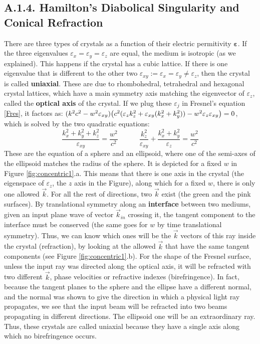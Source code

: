 \documentclass[11pt, a4paper, twoside]{article} %
\begin{document}
\subsection*{A.1.4. Hamilton's Diabolical Singularity and Conical Refraction\vspace{-0.2cm}}
There are three types of crystals as a function of their electric permitivity $\pmb{\varepsilon}$. If the three eigenvalues $\varepsilon_x=\varepsilon_y=\varepsilon_z$ are equal, the medium is isotropic (as we explained). This happens if the crystal has a cubic lattice. If there is one eigenvalue that is different to the other two $\varepsilon_{xy}:=\varepsilon_x=\varepsilon_y\neq \varepsilon_z$, then the crystal is called {\bf uniaxial}. These are due to rhombohedral, tetrahedral and hexagonal crystal lattices, which have a main symmetry axis matching the eigenvector of $\varepsilon_z$, called the {\bf optical axis} of the crystal. If we plug these $\varepsilon_j$ in Fresnel's equation \eqref{Fres}, it factors as: $(k^2c^2-w^2\varepsilon_{xy})\qty(c^2(\varepsilon_zk_z^2+\varepsilon_{xy}(k_x^2+k_y^2))-w^2\varepsilon_z\varepsilon_{xy})=0$, which is solved by the two quadratic equations:
\begin{equation}
\frac{k_x^2+k_y^2+k_z^2}{\varepsilon_{xy}}=\frac{w^2}{c^2} \quad \quad \quad \frac{k_z^2}{\varepsilon_{xy}}+\frac{k_x^2+k_y^2}{\varepsilon_z}=\frac{w^2}{c^2}
\end{equation}
These are the equation of a sphere and an ellipsoid, where one of the semi-axes of the ellipsoid matches the radius of the sphere. It is depicted for a fixed $w$ in Figure \ref{fig:concentric1}.a. This means that there is one axis in the crystal (the eigenspace of $\varepsilon_z$, the $z$ axis in the Figure), along which for a fixed $w$, there is only one allowed $\vec{k}$. For all the rest of directions, two $\vec{k}$ exist (the green and the pink surfaces). By translational symmetry along an {\bf interface} between two mediums, given an input plane wave of vector $\vec{k}_{in}$ crossing it, the tangent component to the interface must be conserved (the same goes for $w$ by time translational symmetry). Thus, we can know which ones will be the $\vec{k}$ vectors of this ray inside the crystal (refraction), by looking at the allowed $\vec{k}$ that have the same tangent components (see Figure \ref{fig:concentric1}.b). For the shape of the Fresnel surface, unless the input ray was directed along the optical axis, it will be refracted with two different $\vec{k}$, phase velocities or refractive indexes (birefringence). In fact, because the tangent planes to the sphere and the ellipse have a different normal, and the normal was shown to give the direction in which a physical light ray propagates, we see that the input beam will be refracted into two beams propagating in different directions. The ellipsoid one will be an extraordinary ray. Thus, these crystals are called uniaxial because they have a single axis along which no birefringence occurs.\vspace{-0.3cm}
\end{document}
